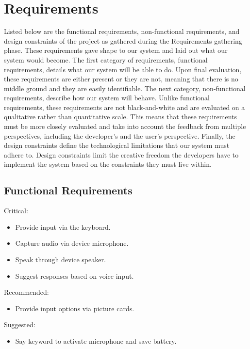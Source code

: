 \chapter{Requirements}

Listed below are the functional requirements, non-functional requirements, and design constraints of the project as gathered during the Requirements gathering phase. These requirements gave shape to our system and laid out what our system would become. The first category of requirements, functional requirements, details what our system will be able to do. Upon final evaluation, these requirements are either present or they are not, meaning that there is no middle ground and they are easily identifiable. The next category, non-functional requirements, describe how our system will behave. Unlike functional requirements, these requirements are not black-and-white and are evaluated on a qualitative rather than quantitative scale. This means that these requirements must be more closely evaluated and take into account the feedback from multiple perspectives, including the developer's and the user's perspective. Finally, the design constraints define the technological limitations that our system must adhere to. Design constraints limit the creative freedom the developers have to implement the system based on the constraints they must live within.

\section{Functional Requirements}
Critical:
\begin{itemize}
\item Provide input via the keyboard.
\item Capture audio via device microphone.
\item Speak through device speaker.
\item Suggest responses based on voice input.
\end{itemize}
Recommended:
\begin{itemize}
\item Provide input options via picture cards.
\end{itemize}
Suggested:
\begin{itemize}
\item Say keyword to activate microphone and save battery.
\end{itemize}

